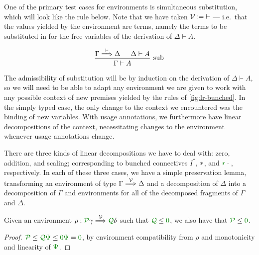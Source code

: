 One of the primary test cases for environments is simultaneous substitution,
which will look like the  rule below.
Note that we have taken $\mathcal V \coloneqq {\vdash}$ --- i.e.\ that the values
yielded by the environment are terms, namely the terms to be substituted in for
the free variables of the derivation of $\Delta \vdash A$.

\begin{displaymath}
  \begin{prooftree}
    \hypo{\Gamma \env{\vdash} \Delta}
    \hypo{\Delta \vdash A}
    \infer2[sub]{\Gamma \vdash A}
  \end{prooftree}
\end{displaymath}

The admissibility of substitution will be by induction on the derivation of
$\Delta \vdash A$, so we will need to be able to adapt any environment we are
given to work with any possible context of new premises yielded by the rules of
\cref{fig:lr-bunched}.
In the simply typed case, the only change to the context we encountered was the
binding of new variables.
With usage annotations, we furthermore have linear decompositions of the
context, necessitating changes to the environment whenever usage annotations
change.

There are three kinds of linear decompositions we have to deal with: zero,
addition, and scaling; corresponding to bunched connectives $I^*$, $\mathbin{*}$, and
$\gr r \cdot {}$, respectively.
In each of these three cases, we have a simple preservation lemma, transforming
an environment
of type $\Gamma \stackrel{\mathcal V}\Longrightarrow \Delta$ and a decomposition of $\Delta$ into a
decomposition of $\Gamma$ and environments for all of the decomposed fragments
of $\Gamma$ and $\Delta$.

\begin{lemma}\label{thm:lr-env-zero}
  Given an environment $\rho : \grP\gamma \env\V \grQ\delta$ such that
  $\grQ \leq \gr 0$, we also have that $\grP \leq \gr 0$.
\end{lemma}
\begin{proof}
  $\grP \leq \grQ\gr\Psi \leq \gr0\gr\Psi = \gr0$, by environment
  compatibility from $\rho$ and monotonicity and linearity of $\gr\Psi$.
\end{proof}

